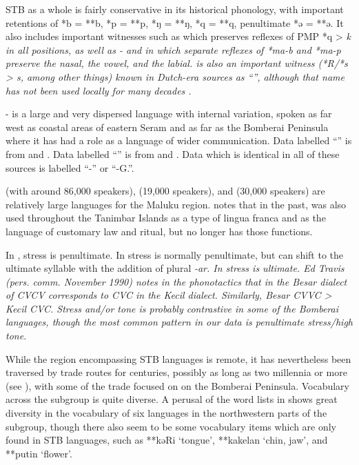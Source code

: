 STB as a whole is fairly conservative in its historical phonology,
with important retentions of *b = **b,
*p = **p, *ŋ = **ŋ,
*q = **q, penultimate *ə = **ə.
It also includes important witnesses such as  which preserves
reflexes of PMP *q > \it{k} in all positions,
as well as -
and  in which separate reflexes of *ma-b
and *ma-p preserve the nasal,
the vowel, and the labial.
 is also an important witness (*R/*s > \it{s},
among other things) known in Dutch-era sources as “”,
although that name has not been used locally for many decades \citep[125]{Collins1986}.

- is a large
and very dispersed language with internal variation,
spoken as far west as coastal areas of eastern Seram
and as far  as the Bomberai Peninsula where it has had a
role as a language of wider communication.
Data labelled “” is from \citet{Collins1986} and \citet{Stokhof1982a}.
Data labelled “” is from \citet{Kakerissa1986} and \citet{Visser2019a}.
Data which is identical in all of these sources is labelled “-” or “-G.”.

 (with around 86,000 speakers),
 (19,000 speakers), and  (30,000 speakers) are
relatively large languages for the Maluku region.
\citet[102]{Hughes1987} notes that in the past,
 was also used throughout the Tanimbar Islands as a type
of lingua franca and as the language of customary law
and ritual, but no longer has those functions.

In , stress is penultimate.
In  stress is normally penultimate,
but can shift to the ultimate syllable with the addition of plural \it{-ar}.
In  stress is ultimate.
Ed Travis (pers. comm.
November 1990) notes in the phonotactics that in the  Besar
dialect of  CVCV corresponds to CVC in the  Kecil dialect.
Similarly,  Besar CVVC >  Kecil CVC.
Stress and/or tone is probably contrastive in some of the Bomberai
languages, though the most common pattern in our data is penultimate stress/high tone.

While the region encompassing STB languages is remote,
it has nevertheless been traversed by trade routes for centuries,
possibly as long as two millennia or more (see ),
with some of the trade focused on  on the Bomberai Peninsula.
Vocabulary across the subgroup is quite diverse.
A perusal of the word lists in \citet[141--146]{Collins1986}
shows great diversity in the vocabulary of six languages in the
northwestern parts of the subgroup,
though there also seem to be some vocabulary items which are
only found in STB languages,
such as **kəRi ‘tongue’,
**kakelan ‘chin, jaw’, and **putin ‘flower’.

